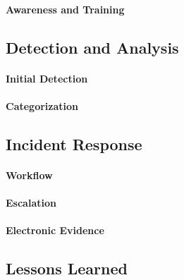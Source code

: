 \paragraph{Awareness and Training}

\subsection{Detection and Analysis}

\paragraph{Initial Detection}

\paragraph{Categorization}

\subsection{Incident Response}

\paragraph{Workflow}

\paragraph{Escalation}

\paragraph{Electronic Evidence}

\subsection{Lessons Learned}